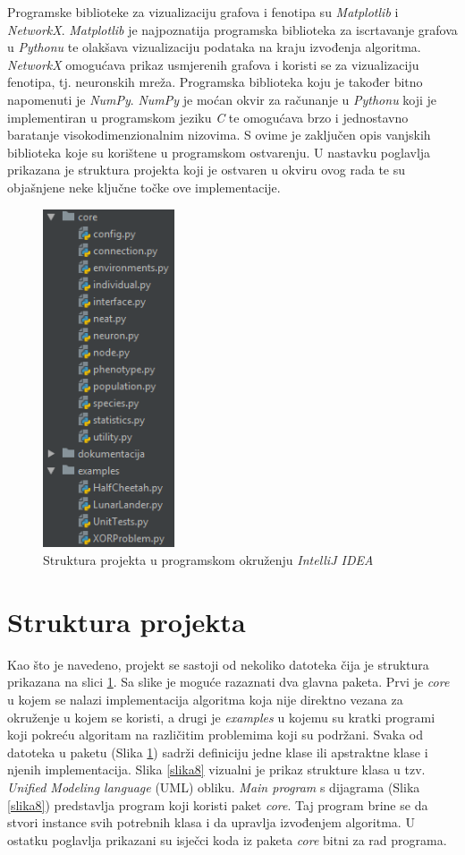 \documentclass[times, utf8, diplomski, numeric]{fer}
\begin{document}
Programske biblioteke za vizualizaciju grafova i fenotipa su \textit{Matplotlib} i \textit{NetworkX}. \textit{Matplotlib} je najpoznatija programska biblioteka za iscrtavanje grafova u \textit{Pythonu} te olakšava vizualizaciju podataka na kraju izvođenja algoritma. \textit{NetworkX} omogućava prikaz usmjerenih grafova i koristi se za vizualizaciju fenotipa, tj. neuronskih mreža. Programska biblioteka koju je također bitno napomenuti je \textit{NumPy}. \textit{NumPy} je moćan okvir za računanje u \textit{Pythonu} koji je implementiran u programskom jeziku \textit{C} te omogućava brzo i jednostavno baratanje visokodimenzionalnim nizovima. S ovime je zaključen opis vanjskih biblioteka koje su korištene u programskom ostvarenju. U nastavku poglavlja prikazana je struktura projekta koji je ostvaren u okviru ovog rada te su objašnjene neke ključne točke ove implementacije.

\begin{figure}
  \centering
  \includegraphics[height=10cm]{slika7}
  \caption{Struktura projekta u programskom okruženju \textit{IntelliJ IDEA}}
  \label{slika7}
\end{figure}

\section{Struktura projekta}
Kao što je navedeno, projekt se sastoji od nekoliko datoteka čija je struktura prikazana na slici \ref{slika7}. Sa slike je moguće razaznati dva glavna paketa. Prvi je \textit{core} u kojem se nalazi implementacija algoritma koja nije direktno vezana za okruženje u kojem se koristi, a drugi je \textit{examples} u kojemu su kratki programi koji pokreću algoritam na različitim problemima koji su podržani. Svaka od datoteka u paketu (Slika \ref{slika7}) sadrži definiciju jedne klase ili apstraktne klase i njenih implementacija. Slika \ref{slika8} vizualni je prikaz strukture klasa u tzv. \textit{Unified Modeling language} (UML) obliku. \textit{Main program} s dijagrama (Slika \ref{slika8}) predstavlja program koji koristi paket \textit{core}. Taj program brine se da stvori instance svih potrebnih klasa i da upravlja izvođenjem algoritma. U ostatku poglavlja prikazani su isječci koda iz paketa \textit{core} bitni za rad programa.
\end{document}

